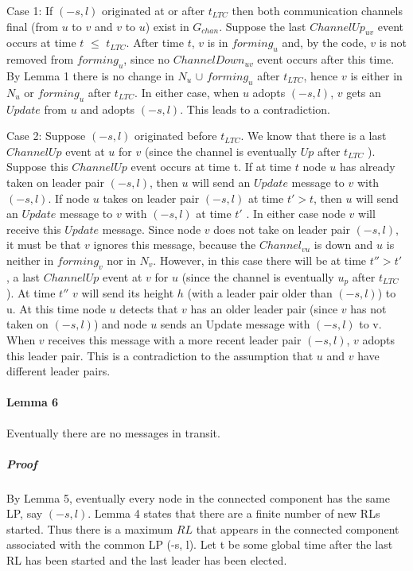 Case 1: If $(-s, l)$ originated at or after $t_{LTC}$ then both communication channels final (from $u$ to $v$ and $v$ to $u$) exist in $G_{chan}$. Suppose the last $ChannelUp_{uv}$ event occurs at time $t$ $\leq$ $t_{LTC}$. After time $t$, $v$ is in $forming_u$ and, by the code, $v$ is not removed from $forming_u$, since no $ChannelDown_{uv}$ event occurs after this time. By Lemma 1 there is no change in $N_u$ $\cup$ $forming_u$ after $t_{LTC}$, hence $v$ is either in $N_u$ or $forming_u$ after $t_{LTC}$. In either case, when $u$ adopts $(-s, l)$, $v$ gets an $Update$ from $u$ and adopts $(-s, l)$. This leads to a contradiction.

Case 2: Suppose $(-s, l)$ originated before $t_{LTC}$. We know that there is a last $ChannelUp$ event at $u$ for $v$ (since the channel is eventually $Up$ after $t_{LTC}$ ). Suppose this $ChannelUp$ event occurs at time t. If at time $t$ node $u$ has already taken on leader pair $(-s, l)$, then $u$ will send an $Update$ message to $v$ with $(-s, l)$. If node $u$ takes on leader pair $(-s, l)$ at time $t'> t$, then $u$ will send an $Update$ message to $v$ with $(-s, l)$ at time $t'$ . In either case node $v$ will receive this $Update$ message. Since node $v$ does not take on leader pair $(-s, l)$, it must be that $v$ ignores this message, because the $Channel_{vu}$ is down and $u$ is neither in $forming_v$ nor in $N_v$. However, in this case there will be at time $t'' > t '$ , a last $ChannelUp$ event at $v$ for $u$ (since the channel is eventually $u_p$ after $t_{LTC}$ ). At time $t''$ $v$ will send its height $h$ (with a leader pair older than $(-s, l)$) to u. At this time node $u$ detects that $v$ has an older leader pair (since $v$ has not taken on $(-s, l)$) and node $u$ sends an Update message with $(-s, l)$ to v. When $v$ receives this message with a more recent leader pair $(-s, l)$, $v$ adopts this leader pair. This is a contradiction to the assumption that $u$ and $v$ have different leader pairs.
\paragraph{Lemma 6}Eventually there are no messages in transit.
\subparagraph{Proof}By Lemma 5, eventually every node in the connected component has the same LP, say $(-s, l)$. Lemma 4 states that there are a finite number of new RLs started. Thus there is a maximum $RL$ that appears in the connected component associated with the common LP (-s, l). Let t be some global time after the last RL has been started and the last leader has been elected.

